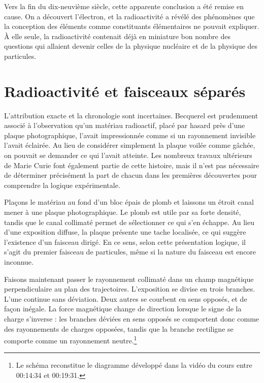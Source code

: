Vers la fin du dix-neuvième siècle, cette apparente conclusion a été remise en cause. On a découvert l’électron, et la radioactivité a révélé des phénomènes que la conception des éléments comme constituants élémentaires ne pouvait expliquer. À elle seule, la radioactivité contenait déjà en miniature bon nombre des questions qui allaient devenir celles de la physique nucléaire et de la physique des particules.

\section{Radioactivité et faisceaux séparés}

L’attribution exacte et la chronologie sont incertaines. Becquerel est prudemment associé à l’observation qu’un matériau radioactif, placé par hasard près d’une plaque photographique, l’avait impressionnée comme si un rayonnement invisible l’avait éclairée. Au lieu de considérer simplement la plaque voilée comme gâchée, on pouvait se demander ce qui l’avait atteinte. Les nombreux travaux ultérieurs de Marie Curie font également partie de cette histoire, mais il n’est pas nécessaire de déterminer précisément la part de chacun dans les premières découvertes pour comprendre la logique expérimentale.

Plaçons le matériau au fond d’un bloc épais de plomb et laissons un étroit canal mener à une plaque photographique. Le plomb est utile par sa forte densité, tandis que le canal collimaté permet de sélectionner ce qui s’en échappe. Au lieu d’une exposition diffuse, la plaque présente une tache localisée, ce qui suggère l’existence d’un faisceau dirigé. En ce sens, selon cette présentation logique, il s’agit du premier faisceau de particules, même si la nature du faisceau est encore inconnue.

Faisons maintenant passer le rayonnement collimaté dans un champ magnétique perpendiculaire au plan des trajectoires. L’exposition se divise en trois branches. L’une continue sans déviation. Deux autres se courbent en sens opposés, et de façon inégale. La force magnétique change de direction lorsque le signe de la charge s’inverse : les branches déviées en sens opposés se comportent donc comme des rayonnements de charges opposées, tandis que la branche rectiligne se comporte comme un rayonnement neutre.\footnote{Le schéma reconstitue le diagramme développé dans la vidéo du cours entre 00:14:34 et 00:19:31.}


